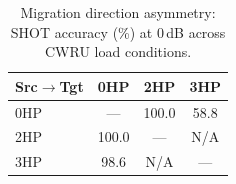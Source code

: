 \begin{table}[!t]
\centering
\footnotesize
\caption{Migration direction asymmetry: SHOT accuracy (\%) at 0\,dB across CWRU load conditions.}
\label{tab:migration}
\begin{tabular}{lccc}
\toprule
Src$\to$Tgt & 0HP & 2HP & 3HP \\
\midrule
0HP & --- & 100.0 & 58.8 \\
2HP & 100.0 & --- & N/A \\
3HP & 98.6 & N/A & --- \\
\bottomrule
\end{tabular}
\end{table}

